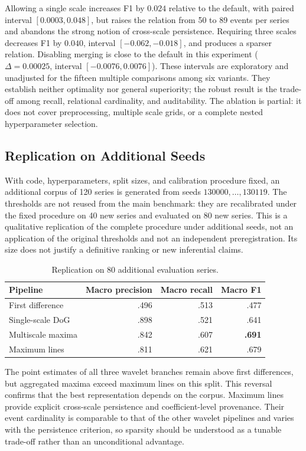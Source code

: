 Allowing a single scale increases F1 by $0.024$ relative to the default, with paired interval $[0.0003,0.048]$, but raises the relation from 50 to 89 events per series and abandons the strong notion of cross-scale persistence. Requiring three scales decreases F1 by $0.040$, interval $[-0.062,-0.018]$, and produces a sparser relation. Disabling merging is close to the default in this experiment ($\Delta=0.00025$, interval $[-0.0076,0.0076]$). These intervals are exploratory and unadjusted for the fifteen multiple comparisons among six variants. They establish neither optimality nor general superiority; the robust result is the trade-off among recall, relational cardinality, and auditability. The ablation is partial: it does not cover preprocessing, multiple scale grids, or a complete nested hyperparameter selection.

\subsection{Replication on Additional Seeds}

With code, hyperparameters, split sizes, and calibration procedure fixed, an additional corpus of 120 series is generated from seeds $130000,\ldots,130119$. The thresholds are not reused from the main benchmark: they are recalibrated under the fixed procedure on 40 new series and evaluated on 80 new series. This is a qualitative replication of the complete procedure under additional seeds, not an application of the original thresholds and not an independent preregistration. Its size does not justify a definitive ranking or new inferential claims.

\begin{table}[H]
\centering
\caption{Replication on 80 additional evaluation series.}
\label{tab:additional_seed}
\small
\begin{tabular}{lrrr}
\toprule
Pipeline & Macro precision & Macro recall & Macro F1 \\
\midrule
First difference & .496 & .513 & .477 \\
Single-scale DoG & .898 & .521 & .641 \\
Multiscale maxima & .842 & .607 & \textbf{.691} \\
Maximum lines & .811 & .621 & .679 \\
\bottomrule
\end{tabular}
\end{table}

The point estimates of all three wavelet branches remain above first differences, but aggregated maxima exceed maximum lines on this split. This reversal confirms that the best representation depends on the corpus. Maximum lines provide explicit cross-scale persistence and coefficient-level provenance. Their event cardinality is comparable to that of the other wavelet pipelines and varies with the persistence criterion, so sparsity should be understood as a tunable trade-off rather than an unconditional advantage.

